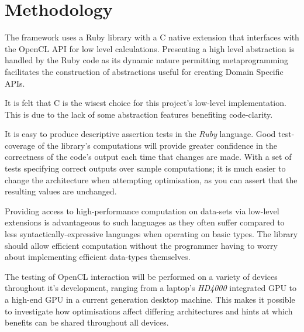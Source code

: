 \section{Methodology}
The framework uses a Ruby library with a C native extension that interfaces with the OpenCL API for low level calculations.
Presenting a high level abstraction is handled by the Ruby code as its dynamic nature permitting metaprogramming facilitates the construction of abstractions useful for creating Domain Specific APIs.

It is felt that C is the wisest choice for this project's low-level implementation. This is due to the lack of some abstraction features benefiting code-clarity. 

It is easy to produce descriptive assertion tests in the \emph{Ruby} language. Good test-coverage of the library's computations will provide greater confidence in the correctness of the code's output each time that changes are made. With a set of tests specifying correct outputs over sample computations; it is much easier to change the architecture when attempting optimisation, as you can assert that the resulting values are unchanged.

Providing access to high-performance computation on data-sets via low-level extensions is advantageous to such languages as they often suffer compared to less syntactically-expressive languages when operating on basic types. The library should allow efficient computation without the programmer having to worry about implementing efficient data-types themselves.

The testing of OpenCL interaction will be performed on a variety of devices throughout it's development, ranging from a laptop's \emph{HD4000} integrated GPU to a high-end GPU in a current generation desktop machine. This makes it possible to investigate how optimisations affect differing architectures and hints at which benefits can be shared throughout all devices.
